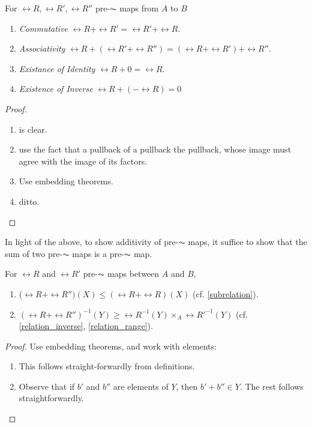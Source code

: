 \begin{lem}
For $\rel{R}, \rel{R}', \rel{R}''$ pre-$\AC$ maps from $A$ to $B$
\begin{enumerate}
\item \emph{Commutative} $\rel{R} + \rel{R}' = \rel{R}' + \rel{R}$.

\item \emph{Associativity} $\rel{R} + (\rel{R}' + \rel{R}'') =
(\rel{R} + \rel{R}') + \rel{R}''$.

\item \emph{Existance of Identity} $\rel{R} + 0 = \rel{R}$.

\item \emph{Existence of Inverse} $\rel{R} + (-\rel{R}) = 0$
\end{enumerate}
\end{lem}
\begin{proof}
\begin{enumerate}
\item is clear.

\item use the fact that a pullback of a pullback the pullback,
whose image must agree with the image of its factors.

\item Use embedding theorems.

\item ditto.
\end{enumerate}
\end{proof}

In light of the above, to show additivity of pre-$\AC$ maps, it 
suffice to show that the sum of two pre-$\AC$ maps is a pre-$\AC$
map.

\begin{lem}\label{lemma_55_star}
For $\rel{R}$ and $\rel{R}'$ pre-$\AC$ maps between $A$ and $B$,
\begin{enumerate}
\item ($\rel{R} + \rel{R}'')(X) \leq (\rel{R} + \rel{R})(X)$ (cf.
\ref{subrelation}).

\item $(\rel{R} + \rel{R}'')^{-1}(Y) \geq \rel{R}^{-1}(Y) \times_A
\rel{R'}^{-1}(Y)$ (cf. \ref{relation_inverse}, \ref{relation_range}).
\end{enumerate}
\end{lem}
\begin{proof}
Use embedding theorems, and work with elements:
\begin{enumerate}
\item This follows straight-forwardly from definitions.

\item Observe that if $b'$ and $b''$ are elements of $Y$, then
$b' + b'' \in Y$. The rest follows straightforwardly.
\end{enumerate}
\end{proof}

